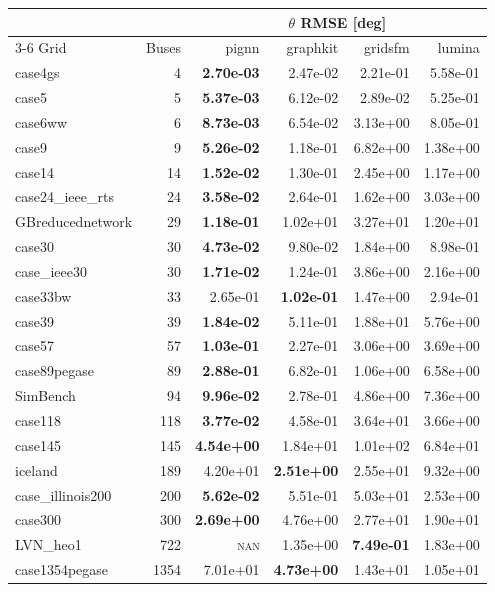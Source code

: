 \documentclass[10pt]{article}
\begin{document}
\begin{table}[H]
\centering\small
\begin{tabular}{lr rrrr}
\toprule
 & & \multicolumn{4}{c}{$\theta$ RMSE [deg]} \\
\cmidrule(lr){3-6}
Grid & Buses & pignn & graphkit & gridsfm & lumina \\
\midrule
case4gs & 4 & \textbf{2.70e-03} & 2.47e-02 & 2.21e-01 & 5.58e-01 \\
case5 & 5 & \textbf{5.37e-03} & 6.12e-02 & 2.89e-02 & 5.25e-01 \\
case6ww & 6 & \textbf{8.73e-03} & 6.54e-02 & 3.13e+00 & 8.05e-01 \\
case9 & 9 & \textbf{5.26e-02} & 1.18e-01 & 6.82e+00 & 1.38e+00 \\
case14 & 14 & \textbf{1.52e-02} & 1.30e-01 & 2.45e+00 & 1.17e+00 \\
case24\_ieee\_rts & 24 & \textbf{3.58e-02} & 2.64e-01 & 1.62e+00 & 3.03e+00 \\
GBreducednetwork & 29 & \textbf{1.18e-01} & 1.02e+01 & 3.27e+01 & 1.20e+01 \\
case30 & 30 & \textbf{4.73e-02} & 9.80e-02 & 1.84e+00 & 8.98e-01 \\
case\_ieee30 & 30 & \textbf{1.71e-02} & 1.24e-01 & 3.86e+00 & 2.16e+00 \\
case33bw & 33 & 2.65e-01 & \textbf{1.02e-01} & 1.47e+00 & 2.94e-01 \\
case39 & 39 & \textbf{1.84e-02} & 5.11e-01 & 1.88e+01 & 5.76e+00 \\
case57 & 57 & \textbf{1.03e-01} & 2.27e-01 & 3.06e+00 & 3.69e+00 \\
case89pegase & 89 & \textbf{2.88e-01} & 6.82e-01 & 1.06e+00 & 6.58e+00 \\
SimBench & 94 & \textbf{9.96e-02} & 2.78e-01 & 4.86e+00 & 7.36e+00 \\
case118 & 118 & \textbf{3.77e-02} & 4.58e-01 & 3.64e+01 & 3.66e+00 \\
case145 & 145 & \textbf{4.54e+00} & 1.84e+01 & 1.01e+02 & 6.84e+01 \\
iceland & 189 & 4.20e+01 & \textbf{2.51e+00} & 2.55e+01 & 9.32e+00 \\
case\_illinois200 & 200 & \textbf{5.62e-02} & 5.51e-01 & 5.03e+01 & 2.53e+00 \\
case300 & 300 & \textbf{2.69e+00} & 4.76e+00 & 2.77e+01 & 1.90e+01 \\
LVN\_heo1 & 722 & \textsc{nan} & 1.35e+00 & \textbf{7.49e-01} & 1.83e+00 \\
case1354pegase & 1354 & 7.01e+01 & \textbf{4.73e+00} & 1.43e+01 & 1.05e+01 \\

\end{tabular}
\end{table}
\end{document}
